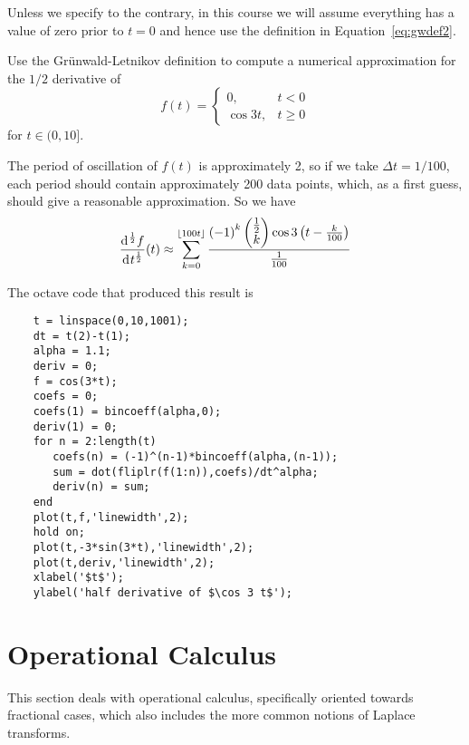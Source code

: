     Unless we specify to the contrary, in this course we will assume everything has a value of zero prior to $t=0$ and hence use the definition in Equation~\ref{eq:gwdef2}. 

    \begin{example}
      Use the Gr\"unwald-Letnikov definition to compute a numerical approximation for the $1/2$ derivative of 
      \begin{equation}
	f(t) = \begin{cases} 0, & t < 0 \\
	  \cos 3 t, & t \geq 0
	\end{cases}
	\label{eq:gwex1}
      \end{equation}
      for $t \in ( 0, 10]$.

      The period of oscillation of $f(t)$ is approximately 2, so if we take $\Delta t = 1/100$, each period should contain approximately 200 data points, which, as a first guess, should give a reasonable approximation. So we have
      \begin{equation*}
	\frac{\operatorname{d}\hspace*{-1pt}^\frac{1}{2} f}{\operatorname{d}\hspace*{-1pt} t^\frac{1}{2}}(t) \approx \sum_{k=0}^{\left\lfloor 100 t \right\rfloor} \frac{ \left( -1 \right)^k \begin{pmatrix} \frac{1}{2} \\ k \end{pmatrix} \cos 3 \left(t - \frac{k}{100}  \right)}{\frac{1}{100}}
      \end{equation*}

      The octave code that produced this result is
      \begin{verbatim}
	t = linspace(0,10,1001);
	dt = t(2)-t(1);
	alpha = 1.1;
	deriv = 0;
	f = cos(3*t);
	coefs = 0;
	coefs(1) = bincoeff(alpha,0);
	deriv(1) = 0;
	for n = 2:length(t)
	   coefs(n) = (-1)^(n-1)*bincoeff(alpha,(n-1));
	   sum = dot(fliplr(f(1:n)),coefs)/dt^alpha;
	   deriv(n) = sum;
	end
	plot(t,f,'linewidth',2);
	hold on;
	plot(t,-3*sin(3*t),'linewidth',2);
	plot(t,deriv,'linewidth',2);
	xlabel('$t$');
	ylabel('half derivative of $\cos 3 t$');
      \end{verbatim}
    \end{example}

    \section{Operational Calculus}
    This section deals with operational calculus, specifically oriented towards fractional cases, which also includes the more common notions of Laplace transforms.

